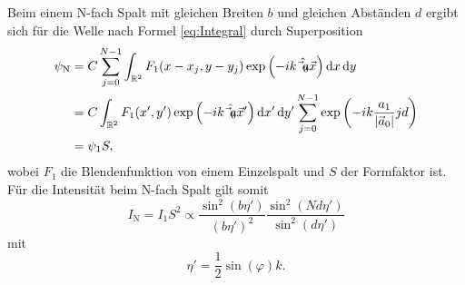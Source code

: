 Beim einem N-fach Spalt mit gleichen Breiten $b$ und gleichen Abständen $d$ ergibt sich für die Welle nach Formel \eqref{eq:Integral} durch Superposition
\begin{equation}
\begin{split}
	\psi_\text{N} &=  C \sum\limits_{j=0}^{N-1} \int_{\mathbb{R}^2} F_1(x-x_j,y-y_j) \exp\left(-i k \hat{\vec{a}_0} \vec{x}\right) \mathop{}\!\mathrm{d} x \mathop{}\!\mathrm{d} y \\
	&= C \int_{\mathbb{R}^2} F_1(x',y') \exp\left(-i k \hat{\vec{a}_0} \vec{x}'\right) \mathop{}\!\mathrm{d} x' \mathop{}\!\mathrm{d} y'  \sum\limits_{j=0}^{N-1} \exp\left(-i k \frac{a_1}{|\vec{a}_0|} j d \right) \\
	&= \psi_1 S,
\end{split}
\end{equation}
wobei $F_1$ die Blendenfunktion von einem Einzelspalt und $S$ der Formfaktor ist.
Für die Intensität beim N-fach Spalt gilt somit
\begin{equation}
	I_\text{N} = I_1 S^2 \propto \frac{\sin^2(b \eta')}{(b\eta')^2}\frac{\sin^2(N d \eta')}{\sin^2(d\eta')}
\end{equation}
mit
\begin{equation}
	\eta'=\frac{1}{2} \sin(\varphi) k.
\end{equation}

